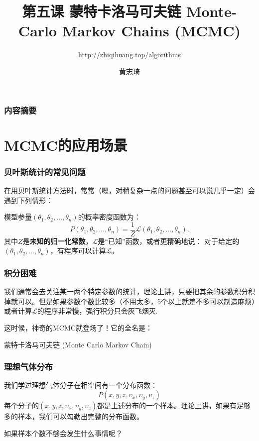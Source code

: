 \documentclass[CJK]{beamer}
\begin{document}
\bch

\title{第五课 蒙特卡洛马可夫链 Monte-Carlo Markov Chains (MCMC)}
\subtitle{http://zhiqihuang.top/algorithms}
\author{黄志琦}
\date{}

\maketitle

\begin{frame}
  \frametitle{内容摘要}
  \tableofcontents
\end{frame}


\section{MCMC的应用场景}

\begin{frame}
  \frametitle{贝叶斯统计的常见问题}

  在用贝叶斯统计方法时，常常（嗯，对稍复杂一点的问题甚至可以说几乎一定）会遇到下列情形：

  \skiplines
  
  模型参量$(\theta_1,\theta_2,\ldots,\theta_n)$的概率密度函数为：
  $$P(\theta_1,\theta_2,\ldots,\theta_n) = \frac{1}{Z} \mathcal{L}(\theta_1,\theta_2,\ldots,\theta_n).$$
  其中$Z$是{\bf 未知的归一化常数}，$\mathcal{L}$是“已知”函数，或者更精确地说： 对于给定的$(\theta_1,\theta_2,\ldots,\theta_n)$，有程序可以计算$\mathcal{L}$。
  
\end{frame}


  \begin{frame}
    \frametitle{积分困难}
    我们通常会去关注某一两个特定参数的统计，理论上讲，只要把其余的参数积分积掉就可以。但是如果参数个数比较多（不用太多，5个以上就差不多可以制造麻烦）或者计算$\mathcal{L}$的程序非常慢，强行积分只会灰飞烟灭\bye.


    \skiplines
    
    这时候，神奇的MCMC就登场了！它的全名是：

   {\blue 蒙特卡洛马可夫链 (Monte Carlo Markov Chain)}


  \end{frame}

  
  \begin{frame}
    \frametitle{理想气体分布}
    我们学过理想气体分子在相空间有一个分布函数：
    $$P(x,y,z,\upsilon_x,\upsilon_y,\upsilon_z)$$
    每个分子的$(x,y,z,\upsilon_x,\upsilon_y,\upsilon_z)$都是上述分布的一个样本。理论上讲，如果有足够多的样本，我们可以勾勒出完整的分布函数。


    \skiplines
    
    如果样本个数不够会发生什么事情呢？

  \end{frame}
\end{document}
